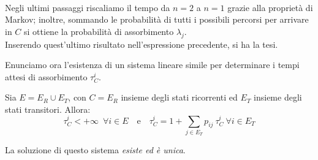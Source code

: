 \begin{dimo}
\begin{align*}
	\end{align*}
	Negli ultimi passaggi riscaliamo il tempo da $n=2$ a $n=1$ grazie alla proprietà di Markov;
	inoltre, sommando le probabilità di tutti i possibili percorsi per arrivare in $C$ si ottiene la probabilità di assorbimento $\lambda_j$. \\
	Inserendo quest'ultimo risultato nell'espressione precedente, si ha la tesi. \qedhere
\end{dimo}

Enunciamo ora l'esistenza di un sistema lineare simile per determinare i tempi attesi di assorbimento $\tau_C^i$.
\begin{prop}
	\label{prop-1818}
	Sia $E = E_R \cup E_T$, con $C = E_R$ insieme degli stati ricorrenti ed $E_T$ insieme degli stati transitori. Allora:
	$$ \tau_C^i < +\infty \enspace \forall i \in E \quad \text{e} \quad \tau_C^i = 1 + \sum_{j \in E_T} p_{ij} \ \tau_C^i \ \forall i \in E_T $$
\end{prop}
\begin{nb}
	La soluzione di questo sistema \emph{esiste ed è unica}.
\end{nb}

